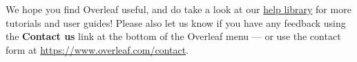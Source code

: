 \documentclass[sigconf]{acmart} %
\begin{document}
\begin{enumerate}
\end{enumerate}

We hope you find Overleaf useful, and do take a look at our \href{https://www.overleaf.com/learn}{help library} for more tutorials and user guides! Please also let us know if you have any feedback using the \textbf{Contact us} link at the bottom of the Overleaf menu --- or use the contact form at \url{https://www.overleaf.com/contact}.



\end{document}
